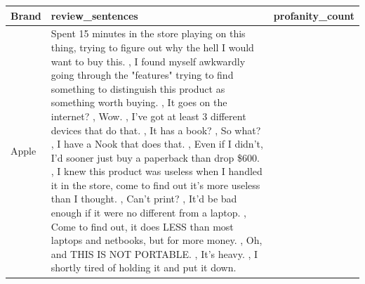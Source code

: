 \begin{longtable*}[t]{>{\raggedright\arraybackslash}p{4em}>{\raggedright\arraybackslash}p{25em}>{\raggedleft\arraybackslash}p{5em}}
\toprule
Brand & review\_sentences & profanity\_count\\
\midrule
Apple & Spent 15 minutes in the store playing on this thing, trying to figure out why the hell I would want to buy this.                                                                                  , I found myself awkwardly going through the "features" trying to find something to distinguish this product as something worth buying.                                                             , It goes on the internet?                                                                                                                                                                          , Wow.                                                                                                                                                                                              , I've got at least 3 different devices that do that.                                                                                                                                               , It has a book?                                                                                                                                                                                    , So what?                                                                                                                                                                                          , I have a Nook that does that.                                                                                                                                                                     , Even if I didn't, I'd sooner just buy a paperback than drop \$600.                                                                                                                                 , I knew this product was useless when I handled it in the store, come to find out it's more useless than I thought.                                                                                , Can't print?                                                                                                                                                                                      , It'd be bad enough if it were no different from a laptop.                                                                                                                                         , Come to find out, it does LESS than most laptops and netbooks, but for more money.                                                                                                                , Oh, and THIS IS NOT PORTABLE.                                                                                                                                                                     , It's heavy.                                                                                                                                                                                       , I shortly tired of holding it and put it down.                
\end{longtable*}
